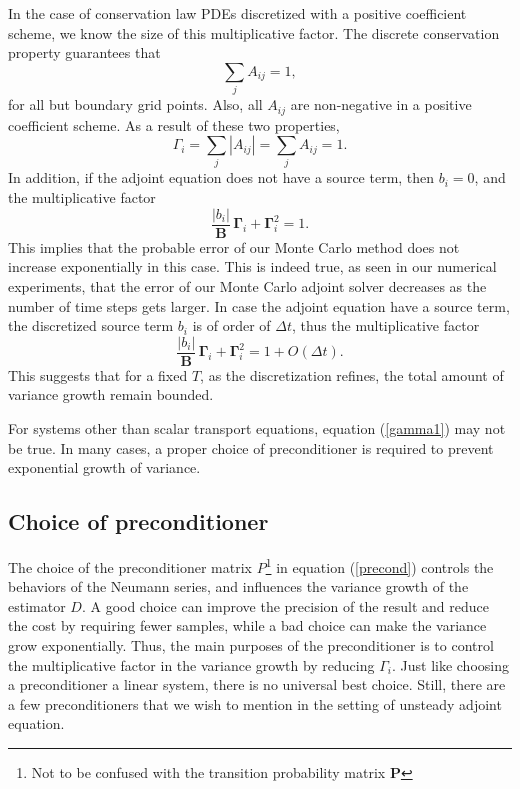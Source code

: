 \documentclass{elsart}
\theoremstyle{remark}
\theoremstyle{definition}
\theoremstyle{proof}
\begin{document}
        In the case of conservation law PDEs discretized with a positive
        coefficient scheme, we know the size of this multiplicative factor.
        The discrete conservation property guarantees that
        \[ \sum_j A_{ij} = 1,
        \]
        for all but boundary grid points.  Also, all $A_{ij}$ are non-negative
        in a positive coefficient scheme.  As a result of these two properties,
        \begin{equation} \label{gamma1}
            \Gamma_i = \sum_j |A_{ij}| = \sum_j A_{ij} = 1.
        \end{equation}
        In addition, if the adjoint equation does not have a source term,
        then $b_i = 0$, and the multiplicative factor
        \[ \frac{|b_i|} {\mathbf{B}}\, \mathbf{\Gamma}_i
            + \mathbf{\Gamma}_i^2 = 1.
        \]
        This implies that the probable error of our Monte Carlo method does
        not increase exponentially in this case.  This is indeed true, as
        seen in our numerical experiments, that the error of our Monte Carlo
        adjoint solver decreases as the number of time steps gets larger.
        In case the adjoint equation have a source term, the discretized
        source term $b_i$ is of order of $\Delta t$, thus the multiplicative
        factor
        \[ \frac{|b_i|} {\mathbf{B}}\, \mathbf{\Gamma}_i
            + \mathbf{\Gamma}_i^2 = 1 + O(\Delta t).
        \]
        This suggests that for a fixed $T$, as the discretization refines,
        the total amount of variance growth remain bounded.

        For systems other than scalar transport equations, equation 
        (\ref{gamma1}) may not be true. In many cases, a proper choice of
        preconditioner is required to prevent exponential growth of variance.



    \subsection{Choice of preconditioner}
        The choice of the preconditioner matrix $P$\footnote{Not to be
        confused with the transition probability matrix $\mathbf{P}$} in
        equation (\ref{precond}) controls the behaviors of the Neumann
        series, and influences the variance growth of the estimator $D$. A
        good choice can improve the precision of the result and reduce the
        cost by requiring fewer samples, while a bad choice can make the
        variance grow exponentially.  Thus, the main purposes of the
        preconditioner is to control the multiplicative factor in the variance
        growth by reducing $\Gamma_i$.  Just like choosing a preconditioner
        a linear system, there is no universal best choice. Still, there are
        a few preconditioners that we wish to mention in the setting of
        unsteady adjoint equation.
        
\end{document}
